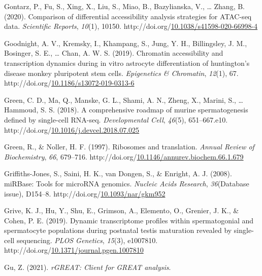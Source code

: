 \documentclass[12pt,twoside]{reedthesis}
\newlength{\cslhangindent}
\newenvironment{CSLReferences}[2] %
 {%
  \setlength{\parindent}{0pt}
  \ifodd #1 \everypar{\setlength{\hangindent}{\cslhangindent}}\ignorespaces\fi
  \ifnum #2 > 0
  \setlength{\parskip}{#2\baselineskip}
  \fi
 }%
 {}
\begin{document}
\begin{CSLReferences}{1}{0}
\leavevmode{}%
Gontarz, P., Fu, S., Xing, X., Liu, S., Miao, B., Bazylianska, V., \ldots{} Zhang, B. (2020). Comparison of differential accessibility analysis strategies for ATAC-seq data. \emph{Scientific Reports}, \emph{10}(1), 10150. http://doi.org/\href{https://doi.org/10.1038/s41598-020-66998-4}{10.1038/s41598-020-66998-4}

\leavevmode{}%
Goodnight, A. V., Kremsky, I., Khampang, S., Jung, Y. H., Billingsley, J. M., Bosinger, S. E., \ldots{} Chan, A. W. S. (2019). Chromatin accessibility and transcription dynamics during in vitro astrocyte differentiation of huntington's disease monkey pluripotent stem cells. \emph{Epigenetics \& Chromatin}, \emph{12}(1), 67. http://doi.org/\href{https://doi.org/10.1186/s13072-019-0313-6}{10.1186/s13072-019-0313-6}

\leavevmode{}%
Green, C. D., Ma, Q., Manske, G. L., Shami, A. N., Zheng, X., Marini, S., \ldots{} Hammoud, S. S. (2018). A comprehensive roadmap of murine spermatogenesis defined by single-cell RNA-seq. \emph{Developmental Cell}, \emph{46}(5), 651--667.e10. http://doi.org/\href{https://doi.org/10.1016/j.devcel.2018.07.025}{10.1016/j.devcel.2018.07.025}

\leavevmode{}%
Green, R., \& Noller, H. F. (1997). Ribosomes and translation. \emph{Annual Review of Biochemistry}, \emph{66}, 679--716. http://doi.org/\href{https://doi.org/10.1146/annurev.biochem.66.1.679}{10.1146/annurev.biochem.66.1.679}

\leavevmode{}%
Griffiths-Jones, S., Saini, H. K., van Dongen, S., \& Enright, A. J. (2008). miRBase: Tools for microRNA genomics. \emph{Nucleic Acids Research}, \emph{36}(Database issue), D154--8. http://doi.org/\href{https://doi.org/10.1093/nar/gkm952}{10.1093/nar/gkm952}

\leavevmode{}%
Grive, K. J., Hu, Y., Shu, E., Grimson, A., Elemento, O., Grenier, J. K., \& Cohen, P. E. (2019). Dynamic transcriptome profiles within spermatogonial and spermatocyte populations during postnatal testis maturation revealed by single-cell sequencing. \emph{PLOS Genetics}, \emph{15}(3), e1007810. http://doi.org/\href{https://doi.org/10.1371/journal.pgen.1007810}{10.1371/journal.pgen.1007810}

\leavevmode{}%
Gu, Z. (2021). \emph{rGREAT: Client for GREAT analysis}.


\end{CSLReferences}
\end{document}
